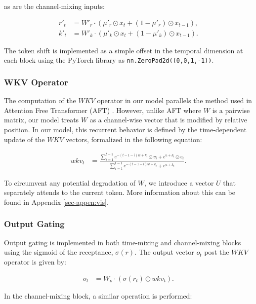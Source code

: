as are the channel-mixing inputs:

\begin{align}\label{eq:channel_mix_eqs1}
r'_t &= W'_r \cdot (\mu'_r \odot x_t + (1 - \mu'_r) \odot x_{t-1} ), \\
\label{eq:channel_mix_eqs2}
k'_t &= W'_k \cdot (\mu'_k \odot x_t + (1 - \mu'_k) \odot x_{t-1} ).
\end{align}

The token shift is implemented as a simple offset in the temporal dimension at each block using the PyTorch \citep{paszke2019pytorch} library as \texttt{nn.ZeroPad2d((0,0,1,-1))}.

\subsubsection{WKV Operator}

The computation of the $WKV$ operator in our model parallels the method used in Attention Free Transformer (AFT) \cite{zhai2021attention}. However, unlike AFT where $W$ is a pairwise matrix, our model treats $W$ as a channel-wise vector that is modified by relative position. In our model, this recurrent behavior is defined by the time-dependent update of the $WKV$ vectors, formalized in the following equation:

\begin{align}
    \label{eq:nom-denom}
    wkv_t &= \frac{ \sum_{i=1}^{t-1} e^{-(t-1-i)w+k_i} \odot v_i + e^{u+k_t} \odot v_t }{\sum_{i=1}^{t-1} e^{-(t-1-i)w+k_i} + e^{u+k_t}}.
\end{align}

To circumvent any potential degradation of $W$, we introduce a vector $U$ that separately attends to the current token. More information about this can be found in Appendix \ref{sec-appen:vis}.

\subsubsection{Output Gating}

Output gating is implemented in both time-mixing and channel-mixing blocks using the sigmoid of the receptance, $\sigma(r)$. The output vector $o_t$ post the $WKV$ operator is given by:

\begin{align}
\label{eq:time-mix4}
o_t &= W_o \cdot (\sigma(r_t) \odot wkv_t).
\end{align}

In the channel-mixing block, a similar operation is performed:

